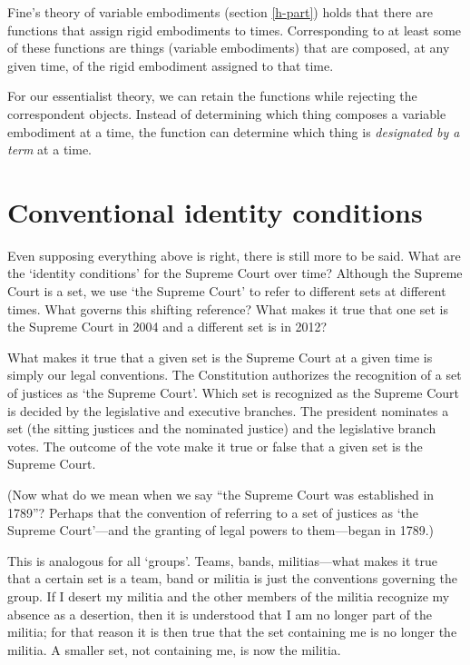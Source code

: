 \documentclass[11pt]{article}
\begin{document}
\begin{spacing}{1.5}
Fine's theory of variable embodiments (section \ref{h-part}) holds
that there are functions that assign rigid embodiments to times.
Corresponding to at least some of these functions are things (variable
embodiments) that are composed, at any given time, of the rigid
embodiment assigned to that time.

For our essentialist theory, we can retain the functions while
rejecting the correspondent objects.  Instead of determining which
thing composes a variable embodiment at a time, the function can
determine which thing is {\em designated by a term} at a time.

\section{Conventional identity conditions}
\label{set-convention}
Even supposing everything above is right, there is still more to be
said.  What are the `identity conditions' for the Supreme Court over
time?  Although the Supreme Court is a set, we use `the Supreme Court'
to refer to different sets at different times.  What governs this
shifting reference?  What makes it true that one set is the Supreme
Court in 2004 and a different set is in 2012?

What makes it true that a given set is the Supreme Court at a given
time is simply our legal conventions.  The Constitution authorizes the
recognition of a set of justices as `the Supreme Court'.  Which set is
recognized as the Supreme Court is decided by the legislative and
executive branches.  The president nominates a set (the sitting
justices and the nominated justice) and the legislative branch votes.
The outcome of the vote make it true or false that a given set is the
Supreme Court.

(Now what do we mean when we say ``the Supreme Court was established
in 1789''?  Perhaps that the convention of referring to a set of
justices as `the Supreme Court'---and the granting of legal powers to
them---began in 1789.)

This is analogous for all `groups'.  Teams, bands, militias---what
makes it true that a certain set is a team, band or militia is just
the conventions governing the group.  If I desert my militia and the
other members of the militia recognize my absence as a desertion, then
it is understood that I am no longer part of the militia; for that
reason it is then true that the set containing me is no longer the
militia.  A smaller set, not containing me, is now the militia.


\end{spacing}
\end{document}
